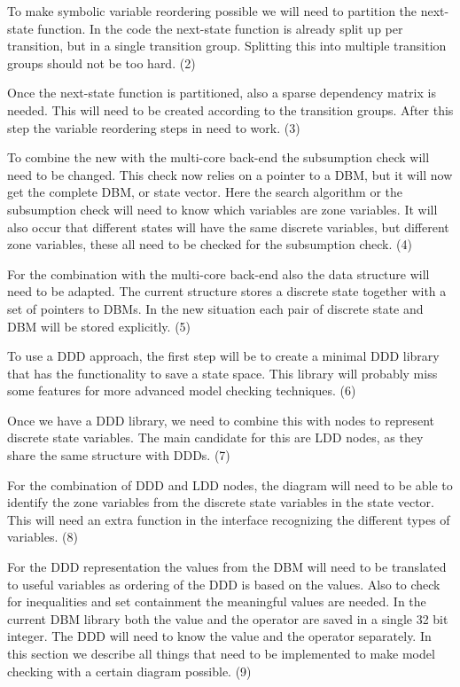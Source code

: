 To make symbolic variable reordering possible we will need to partition the next-state function. In the code the next-state function is already split up per transition, but in a single transition group. Splitting this into multiple transition groups should not be too hard. (2)

Once the next-state function is partitioned, also a sparse dependency matrix is needed. This will need to be created according to the transition groups. After this step the variable reordering steps in \ltsmin{} need to work. (3)

To combine the new \pins{} with the multi-core \ltsmin{} back-end the subsumption check will need to be changed. This check now relies on a pointer to a DBM, but it will now get the complete DBM, or state vector. Here the search algorithm or the subsumption check will need to know which variables are zone variables. It will also occur that different states will have the same discrete variables, but different zone variables, these all need to be checked for the subsumption check. (4)

For the combination with the multi-core back-end also the data structure will need to be adapted. The current structure stores a discrete state together with a set of pointers to DBMs. In the new situation each pair of discrete state and DBM will be stored explicitly. (5)

To use a DDD approach, the first step will be to create a minimal DDD library that has the functionality to save a state space. This library will probably miss some features for more advanced model checking techniques. (6)

Once we have a DDD library, we need to combine this with nodes to represent discrete state variables. The main candidate for this are LDD nodes, as they share the same structure with DDDs. (7)

For the combination of DDD and LDD nodes, the diagram will need to be able to identify the zone variables from the discrete state variables in the state vector. This will need an extra function in the \pins{} interface recognizing the different types of variables. (8)

For the DDD representation the values from the DBM will need to be translated to useful variables as ordering of the DDD is based on the values. Also to check for inequalities and set containment the meaningful values are needed. In the current DBM library both the value and the operator are saved in a single 32 bit integer. The DDD will need to know the value and the operator separately.
In this section we describe all things that need to be implemented to make model checking with a certain diagram possible. (9)


